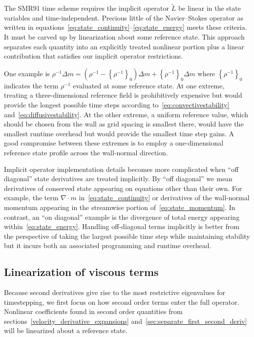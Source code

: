 \documentclass[letterpaper,11pt,nointlimits,reqno,draft]{amsbook}
\newcommand{\reference}[1]{\ensuremath{\left\{#1\right\}_{0}}}
\newcommand{\lessreference}[1]
  {\ensuremath{\left({#1}-\reference{#1}\right)}}
\begin{document}
The SMR91 time scheme requires the implicit operator $\tilde{L}$ be linear in
the state variables and time-independent.  Precious little of the
Navier--Stokes operator as written in
equations~\eqref{eq:state_continuity}--\eqref{eq:state_energy} meets these
criteria.  It must be carved up by linearization about some reference state.
This approach separates each quantity into an explicitly treated nonlinear
portion plus a linear contribution that satisfies our implicit operator
restrictions.

One example is $\rho^{-1}\Delta{}m = \lessreference{\rho^{-1}}\Delta{}m +
\reference{\rho^{-1}}\Delta{}m$ where $\reference{\rho^{-1}}$ indicates the
term $\rho^{-1}$ evaluated at some reference state.  At one extreme, treating a
three-dimensional reference field is prohibitively expensive but would provide
the longest possible time steps according to~\eqref{eq:convectivestability}
and~\eqref{eq:diffusivestability}.  At the other extreme, a uniform reference
value, which should be chosen from the wall as grid spacing is smallest there,
would have the smallest runtime overhead but would provide the smallest time
step gains.  A good compromise between these extremes is to employ a
one-dimensional reference state profile across the wall-normal direction.

Implicit operator implementation details becomes more complicated when ``off
diagonal'' state derivatives are treated implicitly.  By ``off diagonal'' we
mean derivatives of conserved state appearing on equations other than their
own.  For example, the term $\nabla\cdot{}m$ in~\eqref{eq:state_continuity} or
derivatives of the wall-normal momentum appearing in the streamwise portion
of~\eqref{eq:state_momentum}.  In contrast, an ``on diagonal'' example is the
divergence of total energy appearing within~\eqref{eq:state_energy}.  Handling
off-diagonal terms implicitly is better from the perspective of taking the
largest possible time step while maintaining stability but it incurs both an
associated programming and runtime overhead.

\subsection{Linearization of viscous terms}

Because second derivatives give rise to the most restrictive eigenvalues for
timestepping, we first focus on how second order terms enter the full operator.
Nonlinear coefficients found in second order quantities from
sections~\ref{velocity_derivative_expansions}
and~\ref{sec:separate_first_second_deriv} will be linearized about a reference
state.
\end{document}
